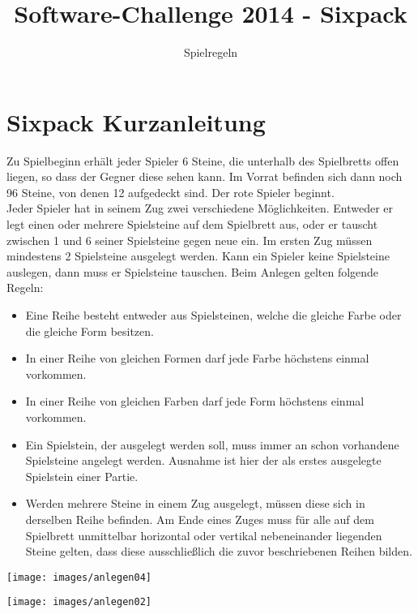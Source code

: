 \documentclass[a4paper, ngerman]{scrartcl}
\title{Software-Challenge 2014 - Sixpack}
\subtitle{Spielregeln}
\begin{document}
\section*{Sixpack Kurzanleitung} Zu Spielbeginn erhält jeder Spieler 6
Steine, die unterhalb des Spielbretts offen liegen, so dass der Gegner diese sehen kann.
Im Vorrat befinden sich dann noch 96 Steine, von denen 12 aufgedeckt sind. Der
rote Spieler beginnt.\\
 Jeder Spieler hat in seinem Zug zwei verschiedene Möglichkeiten. Entweder er
 legt einen oder mehrere Spielsteine auf dem Spielbrett aus, oder er tauscht
 zwischen 1 und 6 seiner Spielsteine gegen neue ein. Im ersten Zug müssen
 mindestens 2 Spielsteine ausgelegt werden. Kann ein Spieler keine
Spielsteine auslegen, dann muss er Spielsteine tauschen.
Beim Anlegen gelten folgende Regeln:
\begin{itemize}
\item Eine Reihe besteht entweder aus Spielsteinen, welche die gleiche Farbe oder die gleiche Form besitzen.
\item In einer Reihe von gleichen Formen darf jede Farbe höchstens einmal vorkommen.
\item In einer Reihe von gleichen Farben darf jede Form höchstens einmal vorkommen.
\item Ein Spielstein, der ausgelegt werden soll, muss immer an schon vorhandene Spielsteine angelegt werden. Ausnahme ist hier der als erstes ausgelegte Spielstein einer Partie.
\item Werden mehrere Steine in einem Zug ausgelegt, müssen diese sich in derselben Reihe befinden. Am Ende eines Zuges muss für alle auf dem Spielbrett unmittelbar horizontal oder vertikal nebeneinander liegenden Steine gelten, dass diese ausschließlich die zuvor beschriebenen Reihen bilden.
\end{itemize}


\begin{minipage}[c]{0.4\textwidth}
	\centering
	\texttt{[image: images/anlegen04]}
\end{minipage}
\begin{minipage}[c]{0.4\textwidth}
	\centering
	\texttt{[image: images/anlegen02]}
\end{minipage}
\vspace{10pt}
\end{document}
